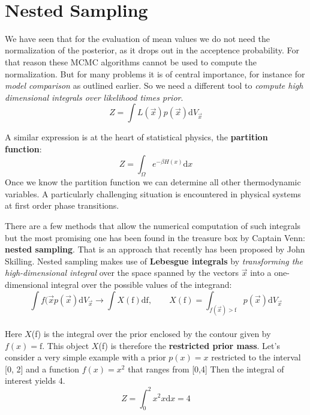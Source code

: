 \documentclass[12pt, a4paper]{scrartcl}
\begin{document}
\\

\section*{Nested Sampling}
We have seen that for the evaluation of mean values we do not need the
normalization of the posterior, as it drops out in the acceptence probability. For that reason these MCMC algorithms cannot be used to compute the normalization.
But for many problems it is of central importance, for instance for \textit{model comparison}
as outlined earlier. So we need a diﬀerent tool to \textit{compute high dimensional
integrals over likelihood times prior}.
\[Z=\int L(\Vec{x})p(\vec{x})\text{d}V_{\vec{x}}\]

A similar expression is at the heart of statistical physics, the  \textbf{partition function}:
\[Z=\int_{\Omega} e^{-\beta H(x)}\text{d}x\]
Once we know the partition function we can determine all other thermodynamic
variables. A particularly challenging situation is encountered in physical systems at first order phase transitions.

There are a few methods that allow the numerical computation of such integrals but the most promising one has been found in the treasure box by Captain Venn:  \textbf{nested sampling}. That is an approach that recently has been proposed by John Skilling.
Nested sampling makes use of  \textbf{Lebesgue integrals} by \textit{transforming the high-dimensional integral} over the space spanned by the vectors $\vec{x}$ into a one-dimensional integral over the possible values of the integrand:
\begin{equation*}\boxed{\int f(\vec{x}p(\vec{x})\text{d}V_{\Vec{x}} \rightarrow \int X(\text{f})\text{d}\text{f}, \qquad X(\text{f})=\int_{f(\vec{x})>\text{f}}p(\vec{x})\text{d}V_{\vec{x}}
}\end{equation*}\\

Here $X$(f) is the integral over the prior enclosed by the contour given by $f(x) = \text{f}$.
This object $X$(f) is therefore the  \textbf{restricted prior mass}. Let’s consider a very simple
example with a prior $p(x) = x$ restricted to the interval [0, 2] and a function $f(x) = x^2$ that ranges from [0,4]
Then the integral of interest yields 4.
\[Z=\int_0^2x^2x\text{d}x=4\]
\end{document}
